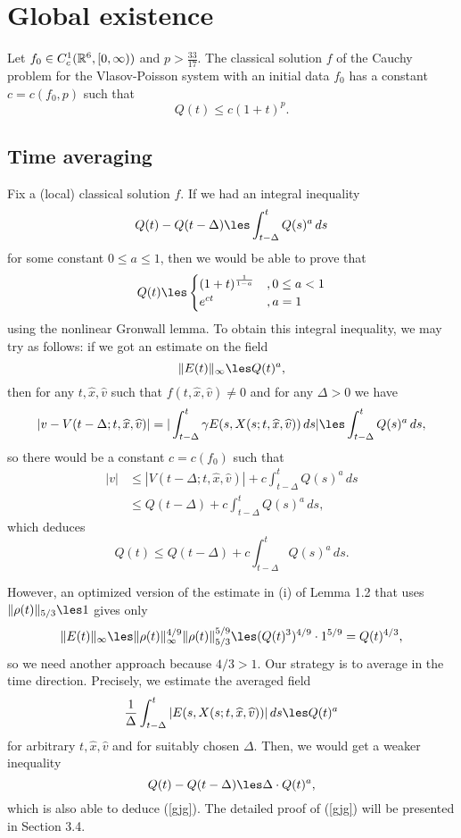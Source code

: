 \documentclass[11pt]{amsart}
\begin{document}
\section{Global existence}



\begin{thm*}[Schaeffer, 1991]
Let $f_0\in C_c^1(\mathbb{R}^6,[0,\infty))$ and $p>\frac{33}{17}$.
The classical solution $f$ of the Cauchy problem for the Vlasov-Poisson system with an initial data $f_0$ has a constant $c=c(f_0,p)$ such that
\[Q(t)\le c(1+t)^p.\]
\end{thm*}

\subsection{Time averaging}
Fix a (local) classical solution $f$.
If we had an integral inequality
\[Q(t)-Q(t-\Delta)\les\int_{t-\Delta}^tQ(s)^a\,ds\]
for some constant $0\le a\le1$, then we would be able to prove that
\begin{align}\label{gjg}
Q(t)\les\begin{cases}(1+t)^{\frac1{1-a}}&,0\le a<1\\e^{ct}&,a=1\end{cases}
\end{align}
using the nonlinear Gronwall lemma.
To obtain this integral inequality, we may try as follows: if we got an estimate on the field
\[\|E(t)\|_\infty\les Q(t)^a,\]
then for any $t,\hat x,\hat v$ such that $f(t,\hat x,\hat v)\ne0$ and for any $\Delta>0$ we have
\[|v-V(t-\Delta;t,\hat x,\hat v)|=|\int_{t-\Delta}^t\gamma E(s,X(s;t,\hat x,\hat v))\,ds|\les\int_{t-\Delta}^tQ(s)^a\,ds,\]
so there would be a constant $c=c(f_0)$ such that
\begin{align*}
|v|&\le|V(t-\Delta;t,\hat x,\hat v)|+c\int_{t-\Delta}^tQ(s)^a\,ds\\
&\le Q(t-\Delta)+c\int_{t-\Delta}^tQ(s)^a\,ds,
\end{align*}
which deduces
\[Q(t)\le Q(t-\Delta)+c\int_{t-\Delta}^tQ(s)^a\,ds.\]

However, an optimized version of the estimate in (i) of Lemma 1.2 that uses $\|\rho(t)\|_{5/3}\les1$ gives only
\[\|E(t)\|_\infty\les\|\rho(t)\|_\infty^{4/9}\|\rho(t)\|_{5/3}^{5/9}\les(Q(t)^3)^{4/9}\cdot1^{5/9}=Q(t)^{4/3},\]
so we need another approach because $4/3>1$.
Our strategy is to average in the time direction.
Precisely, we estimate the averaged field
\[\frac1\Delta\int_{t-\Delta}^t|E(s,X(s;t,\hat x,\hat v))|\,ds\les Q(t)^a\]
for arbitrary $t,\hat x,\hat v$ and for suitably chosen $\Delta$.
Then, we would get a weaker inequality
\[Q(t)-Q(t-\Delta)\les \Delta\cdot Q(t)^a,\]
which is also able to deduce (\ref{gjg}).
The detailed proof of (\ref{gjg}) will be presented in Section 3.4.
\end{document}
